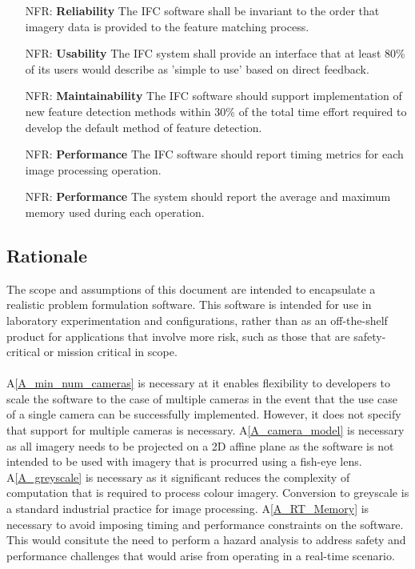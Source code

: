 \documentclass[12pt]{article}
\newcounter{nfrnum} %
\begin{document}
\noindent \begin{itemize}

\item[NFR\refstepcounter{nfrnum}\thenfrnum \label{NFR_Rel_1}:] \textbf{Reliability}
The IFC software shall be invariant to the order that imagery data is provided to the feature 
matching process.

\item[NFR\refstepcounter{nfrnum}\thenfrnum \label{NFR_Use_1}:] \textbf{Usability}
The IFC system shall provide an interface that at least 80\% of its users would describe 
as 'simple to use' based on direct feedback.

\item[NFR\refstepcounter{nfrnum}\thenfrnum \label{NFR_Mtn_1}:] \textbf{Maintainability}
The IFC software should support implementation of new feature detection methods within 30\% 
of the total time effort required to develop the default method of feature detection.

\item[NFR\refstepcounter{nfrnum}\thenfrnum \label{NFR_Perf_1}:] \textbf{Performance}
The IFC software should report timing metrics for each image processing operation.

\item[NFR\refstepcounter{nfrnum}\thenfrnum \label{NFR_Perf_2}:] \textbf{Performance}
The system should report the average and maximum memory used during each operation.


\end{itemize}

\subsection{Rationale}

The scope and assumptions of this document are intended to encapsulate a realistic problem formulation 
software. This software is intended for use in laboratory experimentation and configurations, rather than 
as an off-the-shelf product for applications that involve more risk, such as those that are safety-critical 
or mission critical in scope.\\ \\
A\ref{A_min_num_cameras} is necessary at it enables flexibility to developers to scale the software to the case of multiple cameras in the event that the use case of a single camera can be successfully implemented. However, it does not specify that support for multiple cameras is necessary. A\ref{A_camera_model} is necessary as all imagery needs to be projected on a 2D affine plane as the software is not intended to be used with imagery that is procurred using a fish-eye lens. A\ref{A_greyscale} is necessary as it significant reduces the complexity of computation that is required to process colour imagery. Conversion to greyscale is a standard industrial practice for image processing. A\ref{A_RT_Memory} is necessary to avoid imposing timing and performance constraints on the software. This would consitute the need to perform a hazard analysis to address safety and performance challenges that would arise from operating in a real-time scenario. 
\end{document}
